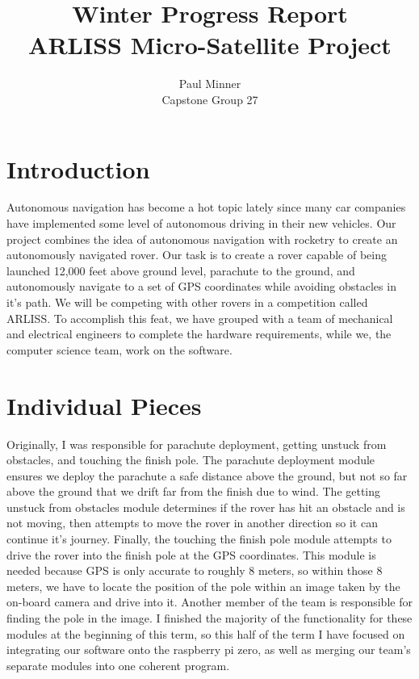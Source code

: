 \documentclass[10pt,letterpaper,onecolumn,journal]{IEEEtran}
\begin{document}

\title{Winter Progress Report\\ARLISS Micro-Satellite Project}
\author{Paul Minner\\Capstone Group 27}
\maketitle

\section{Introduction}
Autonomous navigation has become a hot topic lately since many car companies have implemented some level of autonomous driving in their new vehicles. Our project combines the idea of autonomous navigation with rocketry to create an autonomously navigated rover. Our task is to create a rover capable of being launched 12,000 feet above ground level, parachute to the ground, and autonomously navigate to a set of GPS coordinates while avoiding obstacles in it's path. We will be competing with other rovers in a competition called ARLISS. To accomplish this feat, we have grouped with a team of mechanical and electrical engineers to complete the hardware requirements, while we, the computer science team, work on the software. 

\section{Individual Pieces}
Originally, I was responsible for parachute deployment, getting unstuck from obstacles, and touching the finish pole. The parachute deployment module ensures we deploy the parachute a safe distance above the ground, but not so far above the ground that we drift far from the finish due to wind. The getting unstuck from obstacles module determines if the rover has hit an obstacle and is not moving, then attempts to move the rover in another direction so it can continue it's journey. Finally, the touching the finish pole module attempts to drive the rover into the finish pole at the GPS coordinates. This module is needed because GPS is only accurate to roughly 8 meters, so within those 8 meters, we have to locate the position of the pole within an image taken by the on-board camera and drive into it. Another member of the team is responsible for finding the pole in the image. I finished the majority of the functionality for these modules at the beginning of this term, so this half of the term I have focused on integrating our software onto the raspberry pi zero, as well as merging our team's separate modules into one coherent program. 
\end{document}
